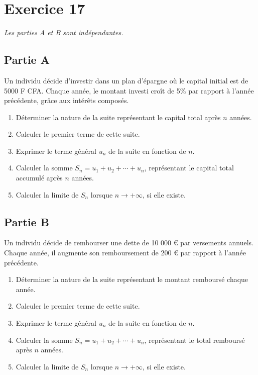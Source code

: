 \documentclass[12pt]{article}
\begin{document}
\section*{Exercice 17}

\textit{Les parties A et B sont indépendantes.}

\subsection*{Partie A}

Un individu décide d’investir dans un plan d’épargne où le capital initial est de 5000 F CFA. Chaque année, le montant investi croît de 5\% par rapport à l’année précédente, grâce aux intérêts composés.

\begin{enumerate}
    \item Déterminer la nature de la suite représentant le capital total après \(n\) années.
    \item Calculer le premier terme de cette suite.
    \item Exprimer le terme général \(u_n\) de la suite en fonction de \(n\).
    \item Calculer la somme \(S_n = u_1 + u_2 + \cdots + u_n\), représentant le capital total accumulé après \(n\) années.
    \item Calculer la limite de \(S_n\) lorsque \(n \to +\infty\), si elle existe.
\end{enumerate}

\subsection*{Partie B}

Un individu décide de rembourser une dette de 10 000 € par versements annuels. Chaque année, il augmente son remboursement de 200 € par rapport à l’année précédente.

\begin{enumerate}
    \item Déterminer la nature de la suite représentant le montant remboursé chaque année.
    \item Calculer le premier terme de cette suite.
    \item Exprimer le terme général \(u_n\) de la suite en fonction de \(n\).
    \item Calculer la somme \(S_n = u_1 + u_2 + \cdots + u_n\), représentant le total remboursé après \(n\) années.
    \item Calculer la limite de \(S_n\) lorsque \(n \to +\infty\), si elle existe.
\end{enumerate}
\end{document}
